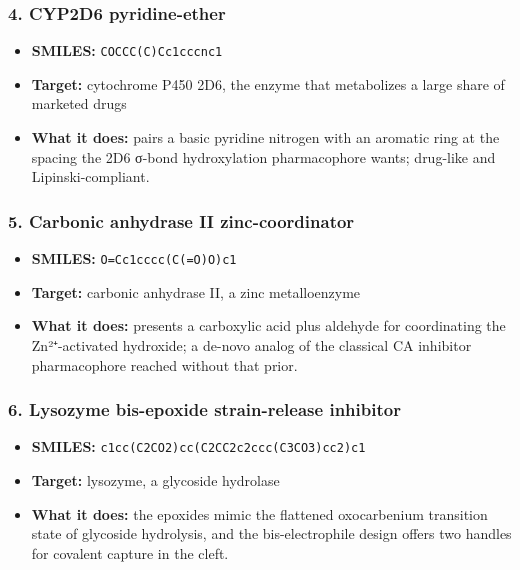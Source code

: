 \documentclass[12pt,a4paper]{article}
\begin{document}
\hypertarget{cyp2d6-pyridine-ether}{%
\subsubsection{4. CYP2D6 pyridine-ether}\label{cyp2d6-pyridine-ether}}

\begin{itemize}
\tightlist
\item
  \textbf{SMILES:} \texttt{COCCC(C)Cc1cccnc1}
\item
  \textbf{Target:} cytochrome P450 2D6, the enzyme that metabolizes a
  large share of marketed drugs
\item
  \textbf{What it does:} pairs a basic pyridine nitrogen with an
  aromatic ring at the spacing the 2D6 σ-bond hydroxylation
  pharmacophore wants; drug-like and Lipinski-compliant.
\end{itemize}

\hypertarget{carbonic-anhydrase-ii-zinc-coordinator}{%
\subsubsection{5. Carbonic anhydrase II
zinc-coordinator}\label{carbonic-anhydrase-ii-zinc-coordinator}}

\begin{itemize}
\tightlist
\item
  \textbf{SMILES:} \texttt{O=Cc1cccc(C(=O)O)c1}
\item
  \textbf{Target:} carbonic anhydrase II, a zinc metalloenzyme
\item
  \textbf{What it does:} presents a carboxylic acid plus aldehyde for
  coordinating the Zn²⁺-activated hydroxide; a de-novo analog of the
  classical CA inhibitor pharmacophore reached without that prior.
\end{itemize}

\hypertarget{lysozyme-bis-epoxide-strain-release-inhibitor}{%
\subsubsection{6. Lysozyme bis-epoxide strain-release
inhibitor}\label{lysozyme-bis-epoxide-strain-release-inhibitor}}

\begin{itemize}
\tightlist
\item
  \textbf{SMILES:} \texttt{c1cc(C2CO2)cc(C2CC2c2ccc(C3CO3)cc2)c1}
\item
  \textbf{Target:} lysozyme, a glycoside hydrolase
\item
  \textbf{What it does:} the epoxides mimic the flattened oxocarbenium
  transition state of glycoside hydrolysis, and the bis-electrophile
  design offers two handles for covalent capture in the cleft.
\end{itemize}
\end{document}
